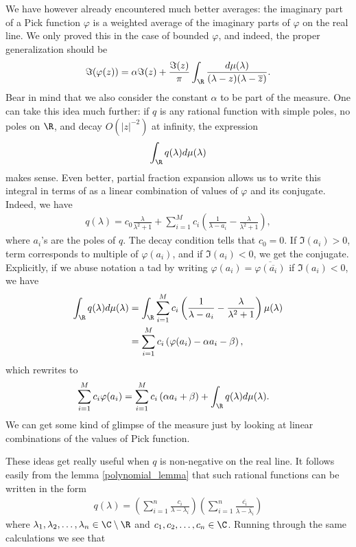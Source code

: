 We have however already encountered much better averages: the imaginary part of a Pick function $\varphi$ is a weighted average of the imaginary parts of $\varphi$ on the real line. We only proved this in the case of bounded $\varphi$, and indeed, the proper generalization should be 
\begin{align*}
	\Im(\varphi(z)) = \alpha \Im(z) + \frac{\Im(z)}{\pi}\int_{\R} \frac{d \mu(\lambda)}{(\lambda - z)(\lambda - \overline{z})}.
\end{align*}
Bear in mind that we also consider the constant $\alpha$ to be part of the measure. One can take this idea much further: if $q$ is any rational function with simple poles, no poles on $\R$, and decay $O(|z|^{-2})$ at infinity, the expression
\begin{align*}
	\int_{\R} q(\lambda) d \mu(\lambda)
\end{align*}
makes sense. Even better, partial fraction expansion allows us to write this integral in terms of as a linear combination of values of $\varphi$ and its conjugate. Indeed, we have
\begin{align*}
	q(\lambda) = c_{0}\frac{\lambda}{\lambda^2 + 1} + \sum_{i = 1}^{M} c_{i} \left(\frac{1}{\lambda - a_{i}} - \frac{\lambda}{\lambda^2 + 1}\right),
\end{align*}
where $a_{i}$'s are the poles of $q$. The decay condition tells that $c_{0} = 0$. If $\Im(a_{i}) > 0$, term corresponds to multiple of $\varphi(a_{i})$, and if $\Im(a_{i}) < 0$, we get the conjugate. Explicitly, if we abuse notation a tad by writing $\varphi(a_{i}) = \overline{\varphi(\overline{a_{i}})}$ if $\Im(a_{i}) < 0$, we have
\begin{align*}
	\int_{\R} q(\lambda) d \mu(\lambda) &= \int_{\R} \sum_{i = 1}^{M} c_{i} \left(\frac{1}{\lambda - a_{i}} - \frac{\lambda}{\lambda^2 + 1}\right)\mu(\lambda) \\
	&= \sum_{i = 1}^{M} c_{i} \left(\varphi(a_{i}) - \alpha a_{i} - \beta\right),
\end{align*}
which rewrites to
\begin{align*}
	\sum_{i = 1}^{M} c_{i} \varphi(a_{i}) &= \sum_{i = 1}^{M} c_{i} \left(\alpha a_{i} + \beta\right) + \int_{\R} q(\lambda) d \mu(\lambda).
\end{align*}
We can get some kind of glimpse of the measure just by looking at linear combinations of the values of Pick function.

These ideas get really useful when $q$ is non-negative on the real line. It follows easily from the lemma \ref{polynomial_lemma} that such rational functions can be written in the form
\begin{align*}
	q(\lambda) = \left( \sum_{i = 1}^{n} \frac{c_{i}}{\lambda - \lambda_{i}}\right) \left(\sum_{i = 1}^{n}\frac{\overline{c_{i}}}{\lambda - \overline{\lambda_{i}}}\right)
\end{align*}
where $\lambda_{1}, \lambda_{2}, \ldots, \lambda_{n} \in \C \setminus \R$ and $c_{1}, c_{2}, \ldots, c_{n} \in \C$. Running through the same calculations we see that


